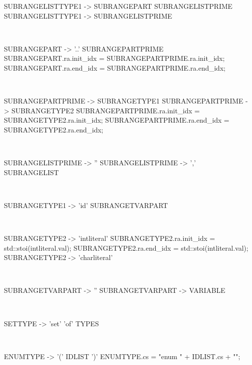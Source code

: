 \begin{verbbox}[\scriptsize]
SUBRANGELISTTYPE1 -> SUBRANGEPART SUBRANGELISTPRIME
SUBRANGELISTTYPE1 -> SUBRANGELISTPRIME
\end{verbbox} 
\theverbbox\\

\begin{verbbox}[\scriptsize]
SUBRANGEPART -> '..' SUBRANGEPARTPRIME
{
SUBRANGEPART.ra.init_idx = SUBRANGEPARTPRIME.ra.init_idx; 
SUBRANGEPART.ra.end_idx = SUBRANGEPARTPRIME.ra.end_idx;
}
\end{verbbox} 
\theverbbox\\

\begin{verbbox}[\scriptsize]
SUBRANGEPARTPRIME -> SUBRANGETYPE1
SUBRANGEPARTPRIME -> SUBRANGETYPE2
{
SUBRANGEPARTPRIME.ra.init_idx = SUBRANGETYPE2.ra.init_idx; 
SUBRANGEPARTPRIME.ra.end_idx = SUBRANGETYPE2.ra.end_idx;
}
\end{verbbox} 
\theverbbox\\

\begin{verbbox}[\scriptsize]
SUBRANGELISTPRIME -> '' {}
SUBRANGELISTPRIME -> ',' SUBRANGELIST
\end{verbbox} 
\theverbbox\\

\begin{verbbox}[\scriptsize]
SUBRANGETYPE1 -> 'id' SUBRANGETVARPART
\end{verbbox}
\theverbbox\\

\begin{verbbox}[\scriptsize]
SUBRANGETYPE2 -> 'intliteral'
{
SUBRANGETYPE2.ra.init_idx = std::stoi(intliteral.val);
SUBRANGETYPE2.ra.end_idx = std::stoi(intliteral.val);
}
SUBRANGETYPE2 -> 'charliteral'
\end{verbbox}
\theverbbox\\

\begin{verbbox}[\scriptsize]
SUBRANGETVARPART -> '' {}
SUBRANGETVARPART -> VARIABLE
\end{verbbox}
\theverbbox\\

\begin{verbbox}[\scriptsize]
SETTYPE -> 'set' 'of' TYPES
\end{verbbox}
\theverbbox\\

\begin{verbbox}[\scriptsize]
ENUMTYPE -> '(' IDLIST ')'
{
ENUMTYPE.cs = "enum {" + IDLIST.cs + "}";
}
\end{verbbox}
\theverbbox\\

